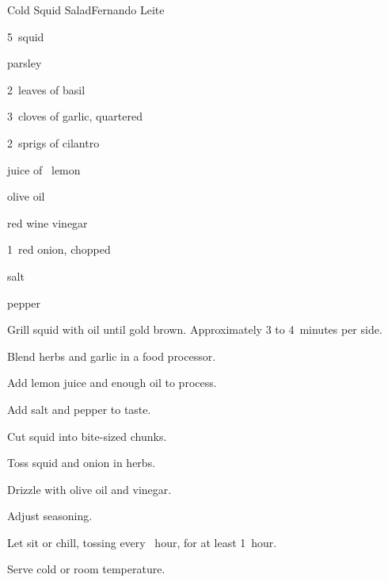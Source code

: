 \begin{recipe}{Cold Squid Salad}{Fernando Leite}{}

\begin{ingredients}
\item 5~squid
\item \C{\quarter} parsley
\item 2~leaves of basil
\item 3~cloves of garlic, quartered
\item 2~sprigs of cilantro
\item juice of \half~lemon
\item olive oil
\item red wine vinegar
\item 1~red onion, chopped
\item salt
\item pepper
\end{ingredients}

\begin{directions}
\item Grill squid with oil until gold brown. Approximately 3 to 4~minutes per side.
\item Blend herbs and garlic in a food processor.
\item Add lemon juice and enough oil to process.
\item Add salt and pepper to taste.
\item Cut squid into bite-sized chunks.
\item Toss squid and onion in herbs.
\item Drizzle with olive oil and vinegar.
\item Adjust seasoning.
\item Let sit or chill, tossing every \half~hour, for at least 1~hour.
\item Serve cold or room temperature.
\end{directions}

\end{recipe}
